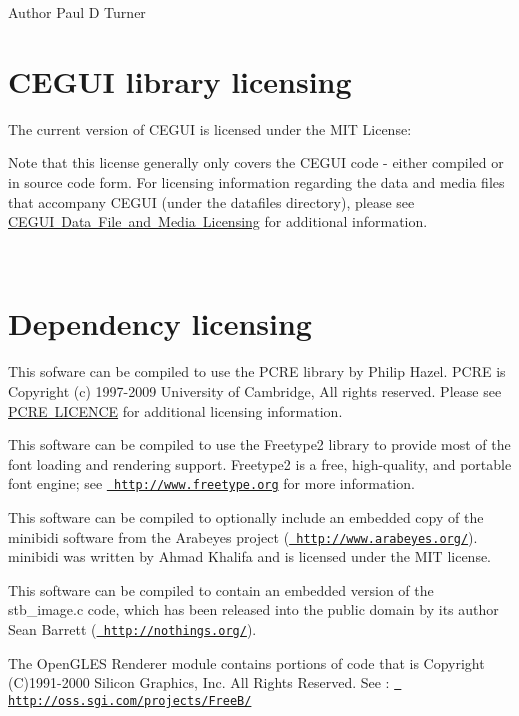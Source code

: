 \begin{DoxyAuthor}{Author}
Paul D Turner
\end{DoxyAuthor}
\hypertarget{licensing_licensing_sec_1}{}\section{C\+E\+G\+U\+I library licensing}\label{licensing_licensing_sec_1}
The current version of C\+E\+G\+UI is licensed under the M\+IT License\+: 
\begin{DoxyVerbInclude}
\end{DoxyVerbInclude}


Note that this license generally only covers the C\+E\+G\+UI code -\/ either compiled or in source code form. For licensing information regarding the data and media files that accompany C\+E\+G\+UI (under the datafiles directory), please see \mbox{\hyperlink{datafile_licensing}{C\+E\+G\+UI Data File and Media Licensing}} for additional information.

~\newline
 \hypertarget{licensing_licensing_sec_3}{}\section{Dependency licensing}\label{licensing_licensing_sec_3}

\begin{DoxyItemize}
\item This sofware can be compiled to use the P\+C\+RE library by Philip Hazel. P\+C\+RE is Copyright (c) 1997-\/2009 University of Cambridge, All rights reserved. Please see \mbox{\hyperlink{pcre_lic}{P\+C\+RE L\+I\+C\+E\+N\+CE}} for additional licensing information.
\item This software can be compiled to use the Freetype2 library to provide most of the font loading and rendering support. Freetype2 is a free, high-\/quality, and portable font engine; see \href{http://www.freetype.org}{\texttt{ http\+://www.\+freetype.\+org}} for more information.
\item This software can be compiled to optionally include an embedded copy of the minibidi software from the Arabeyes project (\href{http://www.arabeyes.org/}{\texttt{ http\+://www.\+arabeyes.\+org/}}). minibidi was written by Ahmad Khalifa and is licensed under the M\+IT license.
\item This software can be compiled to contain an embedded version of the stb\+\_\+image.\+c code, which has been released into the public domain by it\textquotesingle{}s author Sean Barrett (\href{http://nothings.org/}{\texttt{ http\+://nothings.\+org/}}).
\item The Open\+G\+L\+ES Renderer module contains portions of code that is Copyright (C)1991-\/2000 Silicon Graphics, Inc. All Rights Reserved. See \+: \href{http://oss.sgi.com/projects/FreeB/}{\texttt{ http\+://oss.\+sgi.\+com/projects/\+Free\+B/}}
\end{DoxyItemize}

